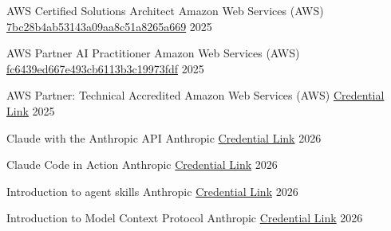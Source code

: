 

\begin{cvhonors}

  \cvhonor
    {AWS Certified Solutions Architect} %
    {Amazon Web Services (AWS)} %
    {\href{https://cp.certmetrics.com/amazon/en/public/verify/credential}{7bc28b4ab53143a0\allowbreak9aa8c51a8265a669}} %
    {2025} %

  \cvhonor
    {AWS Partner AI Practitioner} %
    {Amazon Web Services (AWS)} %
    {\href{https://cp.certmetrics.com/amazon/en/public/verify/credential}{fc6439ed667e49\allowbreak3cb6113b3c19973fdf}} %
    {2025} %

  \cvhonor
    {AWS Partner: Technical Accredited} %
    {Amazon Web Services (AWS)} %
    {\href{https://www.credly.com/badges/09b8158c-ed6d-4068-a305-7c369b1739c0/linked_in_profile}{Credential Link}} %
    {2025} %


  \cvhonor
    {Claude with the Anthropic API} %
    {Anthropic} %
    {\href{https://verify.skilljar.com/c/7qxfmb87nn3n}{Credential Link}} %
    {2026} %

  \cvhonor
    {Claude Code in Action} %
    {Anthropic} %
    {\href{https://verify.skilljar.com/c/gyj7p5adng5p}{Credential Link}} %
    {2026} %


  \cvhonor
    {Introduction to agent skills} %
    {Anthropic} %
    {\href{https://verify.skilljar.com/c/y4738upfscsg}{Credential Link}} %
    {2026} %

\cvhonor
    {Introduction to Model Context Protocol} %
    {Anthropic} %
    {\href{https://verify.skilljar.com/c/y8ve8n6rf3oz}{Credential Link}} %
    {2026} %


\end{cvhonors}
